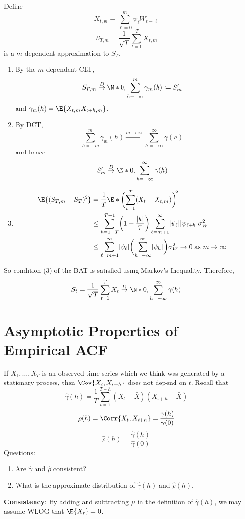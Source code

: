 \begin{Proof}{}{}
    Define
    \[ X_{t,m}=\sum_{\ell=0}^{m} \psi_\ell W_{t-\ell} \]
    \[ S_{T,m}=\frac{1}{\sqrt{T}} \sum_{t=1}^{T} X_{t,m} \]
    is a $ m $-dependent approximation to $ S_T $.
    \begin{enumerate}[(1)]
        \item By the $ m $-dependent CLT,
              \[ S_{T,m}\stackrel{D}{\to}\N*{0,\sum_{h=-m}^{m} \gamma_m(h)}\coloneq
                  S_m^\prime \]
              and $ \gamma_m(h)=\E{X_{t,m}X_{t+h,m}} $.
        \item By DCT,
              \[ \sum_{h=-m}^{m} \gamma_m(h)
                  \stackrel{m\to\infty}{\to}\sum_{h=-\infty}^{\infty} \gamma(h) \]
              and hence
              \[ S_m^\prime\stackrel{D}{\to}\N*{0,\sum_{h=-\infty}^{\infty} \gamma(h)} \]
        \item \begin{align*}
                  \E{(S_{T,m}-S_T)^2}
                   & =\frac{1}{T} \E*{\biggl(\sum_{t=1}^{T}(X_t-X_{t,m}) \biggr)^{\!2}} \\
                   & \le \sum_{h=1-T}^{T-1} \biggl(1-\frac{\abs{h}}{T} \biggr)
                  \sum_{\ell=m+1}^{\infty}\abs{\psi_\ell}\abs{\psi_{\ell+h}}\sigma_W^2  \\
                   & \le \sum_{\ell=m+1}^{\infty} \abs{\psi_\ell}
                  \biggl(\sum_{h=-\infty}^{\infty} \abs{\psi_h}\biggr)\sigma_W^2\to 0\text{ as }m\to\infty
              \end{align*}
    \end{enumerate}
    So condition (3) of the BAT is satisfied using Markov's Inequality. Therefore,
    \[ S_t=\frac{1}{\sqrt{T}}\sum_{t=1}^{T} X_t\stackrel{D}{\to}\N*{0,\sum_{h=-\infty}^{\infty} \gamma(h)}  \]
\end{Proof}
\section{Asymptotic Properties of Empirical ACF}
If $ X_1,\ldots,X_T $ is an observed time series
which we think was generated by a stationary process, then
$ \Cov{X_t,X_{t+h}} $ does not depend on $ t $. Recall that
\[ \hat{\gamma}(h)=\frac{1}{T} \sum_{t=1}^{T-h}(X_t-\bar{X})(X_{t+h}-\bar{X}) \]
\[ \rho(h)=\Corr{X_t,X_{t+h}}=\frac{\gamma(h)}{\gamma(0)} \]
\[ \hat{\rho}(h)=\frac{\hat{\gamma}(h)}{\hat{\gamma}(0)}  \]
Questions:
\begin{enumerate}[(1)]
    \item Are $ \hat{\gamma} $ and $ \hat{\rho} $ consistent?
    \item What is the approximate distribution of $ \hat{\gamma}(h) $
          and $ \hat{\rho}(h) $.
\end{enumerate}
\textbf{Consistency}: By adding and subtracting $ \mu $ in the definition
of $ \hat{\gamma}(h) $, we may assume WLOG that $ \E{X_t}=0 $.

